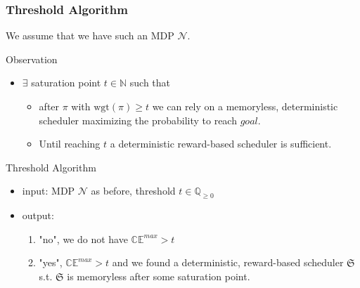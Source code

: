 \documentclass[onlymath]{beamer}
\begin{document}
\begin{frame}
	\frametitle{Threshold Algorithm}
	We assume that we have such an MDP $\mathcal{N}$. \pause
	\begin{block}{Observation}
		\begin{itemize}
			\item $\exists$ saturation point $t \in \mathbb{N}$ such that \pause
			\begin{itemize}
				\item after $\pi$ with $\mathrm{wgt}(\pi) \geq t$ we can rely on a memoryless, deterministic scheduler maximizing the probability to reach $goal$. \pause
				\item Until reaching $t$ a deterministic reward-based scheduler is sufficient.
			\end{itemize}
		\end{itemize}
	\end{block}
\pause
	\begin{block}{Threshold Algorithm}
		\begin{itemize}
			\item input: MDP $\mathcal{N}$ as before, threshold $t \in \mathbb{Q}_{\geq 0}$\pause
			\item output:\begin{enumerate}
				\item "no", we do not have $\mathbb{CE}^{max}>t$
				\item "yes", $\mathbb{CE}^{max}>t$ and we found a deterministic, reward-based scheduler $\mathfrak{S}$ s.t. \pause $\mathfrak{S}$ is memoryless after some saturation point.
			\end{enumerate}
		\end{itemize}
	\end{block}
\end{frame}
\end{document}
